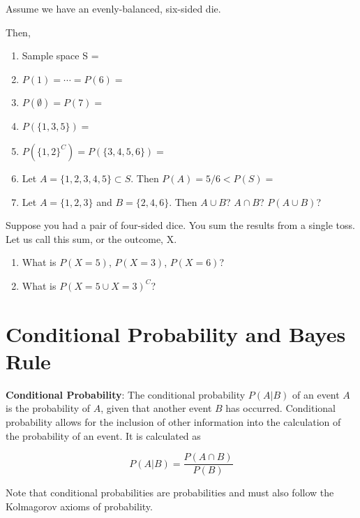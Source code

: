 \documentclass[]{book}
\providecommand{\tightlist}{%
  \setlength{\itemsep}{0pt}\setlength{\parskip}{0pt}}
\theoremstyle{definition}
\theoremstyle{definition}
\theoremstyle{definition}
\theoremstyle{remark}
\let\BeginKnitrBlock\begin \let\EndKnitrBlock\end
\begin{document}
\BeginKnitrBlock{example}[Probability]
\protect\hypertarget{exm:prob}{}{\label{exm:prob} {} }
Assume we have an evenly-balanced, six-sided die.

Then,

\begin{enumerate}
\def\labelenumi{\arabic{enumi}.}
\tightlist
\item
  Sample space S =
\item
  \(P(1)=\cdots=P(6)=\)
\item
  \(P(\emptyset)=P(7)=\)
\item
  \(P\left( \{ 1, 3, 5 \} \right)=\)
\item
  \(P\left( \{ 1, 2 \}^C \right)= P\left( \{ 3, 4, 5, 6 \}\right)=\)
\item
  Let \(A=\{ 1,2,3,4,5 \}\subset S\). Then \(P(A)=5/6<P(S)=\)
\item
  Let \(A=\{ 1, 2, 3 \}\) and \(B=\{ 2, 4, 6 \}\). Then \(A\cup B\)? \(A\cap B\)? \(P(A \cup B)\)?
\end{enumerate}
\EndKnitrBlock{example}

\BeginKnitrBlock{exercise}[Probability]
\protect\hypertarget{exr:prob1}{}{\label{exr:prob1} {} }
Suppose you had a pair of four-sided dice. You sum the results from a single toss. Let us call this sum, or the outcome, X.

\begin{enumerate}
\def\labelenumi{\arabic{enumi}.}
\item
  What is \(P(X = 5)\), \(P(X = 3)\), \(P(X = 6)\)?
\item
  What is \(P(X=5 \cup X = 3)^C\)?
\end{enumerate}
\EndKnitrBlock{exercise}

\hypertarget{conditional-probability-and-bayes-rule}{%
\section{Conditional Probability and Bayes Rule}\label{conditional-probability-and-bayes-rule}}

\textbf{Conditional Probability}: The conditional probability \(P(A|B)\) of an event \(A\) is the probability of \(A\), given that another event \(B\) has occurred. Conditional probability allows for the inclusion of other information into the calculation of the probability of an event. It is calculated as

\[P(A|B)=\frac{P(A\cap B)}{P(B)}\]

Note that conditional probabilities are probabilities and must also follow the Kolmagorov axioms of probability.
\end{document}
